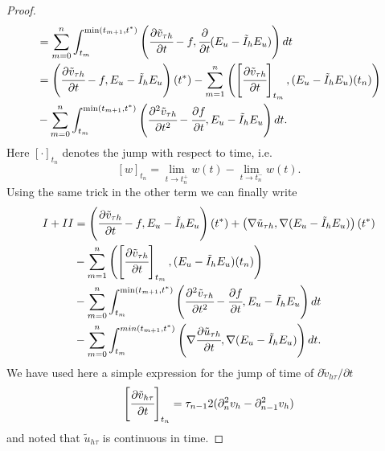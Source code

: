 \documentclass{imanum}
\begin{document}
\begin{proof}
\begin{align*}
\nonumber & =
   \sum_{m = 0}^n \int_{t_m}^{\min (t_{m + 1}, t^{\ast})}\left(\cfrac{{{\partial } \tilde{v}_{{\tau} h}}}{\partial t}-f,\cfrac{\partial}{\partial t} (E_{u}-\tilde I_{h} E_{u})\right) d t \\
 \nonumber & = \left( \cfrac{{{\partial } \tilde{v}_{{\tau} h}}}{\partial t}-f, E_u -\tilde  I_h E_u \right)
   (t^{\ast}) - \sum_{m = 1}^n \left( \left[ \cfrac{{{\partial } \tilde{v}_{{\tau} h}}}{\partial t} \right]_{t_m}, (  E_u - \tilde I_h E_u) (t_n) \right) \\
 & - \sum_{m = 0}^n \int_{t_m}^{\min (t_{m + 1}, t^{\ast})} \left(
   \cfrac{{{\partial^2 } \tilde{v}_{{\tau} h}}}{\partial t^2}-\cfrac{\partial {f}}{\partial t},  E_u -\tilde  I_h E_u
   \right) dt .
\end{align*}
Here $[\cdot]_{t_n}$ denotes the jump with respect to time, i.e. 
$$[w]_{t_n} = \lim_{t
\rightarrow t_n^+} w ( t) - \lim_{t \rightarrow t_n^-} w ( t).$$
 Using the
same trick in the other term we can finally write
\begin{align}
  \nonumber I +I I &
  =\left( \cfrac{{{\partial } \tilde{v}_{{\tau} h}}}{\partial t}-f, E_u - \tilde I_h E_u \right)
   (t^{\ast})+\left({\nabla} \tilde{u}_{{\tau} h},{\nabla} ( E_{u}-\tilde I_{h} E_{u})\right)(t^{{\ast}})\\
  \nonumber &  -\sum_{m = 1}^n \left( \left[ \cfrac{{{\partial } \tilde{v}_{{\tau} h}}}{\partial t} \right]_{t_m}, (  E_u - \tilde I_h E_u) (t_n) \right)\\
  \nonumber & - \sum_{m = 0}^n \int_{t_m}^{\min (t_{m + 1}, t^{\ast})} \left(
   \cfrac{{{\partial^2 } \tilde{v}_{{\tau} h}}}{\partial t^2}-\cfrac{\partial {f}}{\partial t},  E_u -\tilde  I_h E_u
   \right) dt\\&-\sum_{m=0}^{n}\int_{t_{m}}^{min
  (t_{m+1},t^{{\ast}})}\left({\nabla} \cfrac{{{\partial } \tilde{u}_{{\tau} h}}}{\partial t},{\nabla} ( E_{u}-\tilde I_{h} E_{u})\right) d t.
\end{align}
We have used here a simple expression for the jump of time of
${\partial
\tilde{v}_{h\tau}}/\partial t$
\begin{equation}\left[ \cfrac{\partial \tilde{v}_{h\tau}}{\partial t} \right]_{t_n} = {\tau_{n
   - 1}}{2}  (\partial_n^2 v_h - \partial_{n - 1}^2 v_h) 
\end{equation}
and noted that $\tilde{u}_{h\tau}$ is continuous in time.


\end{proof}
\end{document}
